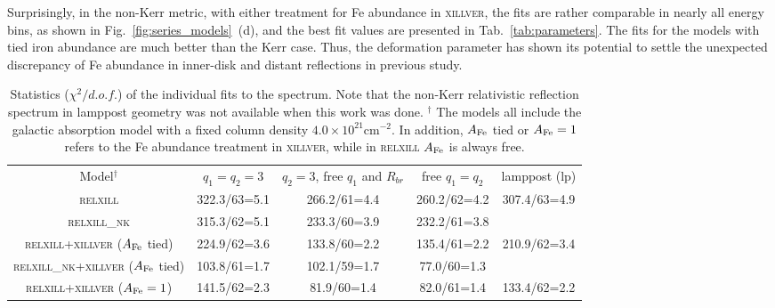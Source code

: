 \documentclass[11pt,a4paper,pdftex]{article}
\begin{document}
Surprisingly, in the non-Kerr metric, with either treatment for Fe abundance in \textsc{xillver}, the fits are rather comparable in nearly all energy bins, as shown in Fig.~\ref{fig:series_models}~(d), and the best fit values are presented in Tab.~\ref{tab:parameters}. The fits for the models with tied iron abundance are much better than the Kerr case. Thus, the deformation parameter has shown its potential to settle the unexpected discrepancy of Fe abundance in inner-disk and distant reflections in previous study.


\begin{table*}%
\begin{center}
{\tiny
\caption{Statistics ($\chi^2/d.o.f.$) of the individual fits to the spectrum. Note that the non-Kerr relativistic reflection spectrum in lamppost geometry was not available when this work was done. $^\dagger$ The models all include the galactic absorption model with a fixed column density $4.0\times 10^{21}$cm$^{-2}$.  In addition, $A_{\rm Fe}$ tied or $A_{\rm Fe}=1$ refers to the Fe abundance treatment in \textsc{xillver}, while in \textsc{relxill} $A_{\rm Fe}$ is always free.\label{tab:chisq_change}}
{\renewcommand{\arraystretch}{1.3}%
\begin{tabular}{ccccc}\hline \hline
\hspace{0.3cm} Model$^\dagger$ \hspace{0.3cm}&\hspace{0.3cm}$q_1=q_2=3$\hspace{0.3cm}& \hspace{0.3cm} $q_2=3$, free $q_1$ and $R_{br}$ \hspace{0.3cm}&\hspace{0.3cm}free $q_1=q_2$\hspace{0.3cm}&\hspace{0.3cm}lamppost (lp)\hspace{0.3cm}\\
\textsc{relxill} & 322.3/63=5.1 & 266.2/61=4.4& 260.2/62=4.2 & 307.4/63=4.9 \\
\textsc{relxill\_nk} & 315.3/62=5.1 & 233.3/60=3.9 & 232.2/61=3.8 &  \\
\hline
\textsc{relxill+xillver} ($A_{\rm Fe}$ tied)& 224.9/62=3.6 & 133.8/60=2.2& 135.4/61=2.2 & 210.9/62=3.4 \\
\textsc{relxill\_nk+xillver} ($A_{\rm Fe}$ tied) & 103.8/61=1.7 & 102.1/59=1.7 & 77.0/60=1.3 &  \\
\textsc{relxill+xillver} ($A_{\rm Fe}=1$)& 141.5/62=2.3 & 81.9/60=1.4& 82.0/61=1.4 & 133.4/62=2.2 \\

\end{tabular}}}
\end{center}
\end{table*}
\end{document}
